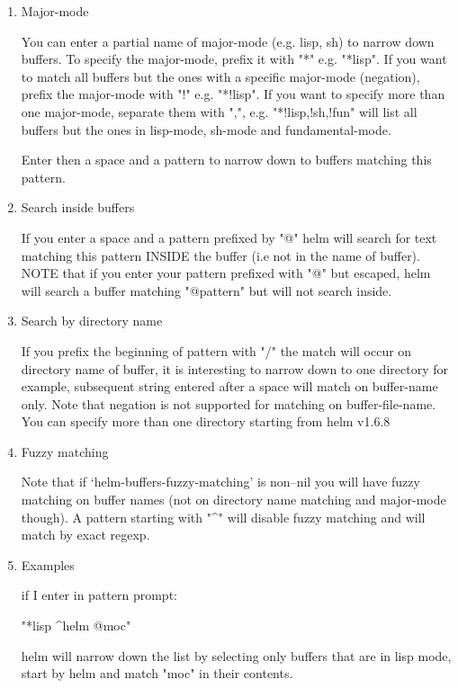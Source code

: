 \documentclass[11pt]{article}
\begin{document}
\begin{enumerate}
\item Major-mode
\label{sec:org63c0550}

You can enter a partial name of major-mode (e.g. lisp, sh) to narrow down buffers.
To specify the major-mode, prefix it with "*" e.g. "*lisp".
If you want to match all buffers but the ones with a specific major-mode (negation),
prefix the major-mode with "!" e.g. "*!lisp".
If you want to specify more than one major-mode, separate them with ",",
e.g. "*!lisp,!sh,!fun" will list all buffers but the ones in lisp-mode, sh-mode and
fundamental-mode.

Enter then a space and a pattern to narrow down to buffers matching this pattern.

\item Search inside buffers
\label{sec:orge420310}

If you enter a space and a pattern prefixed by "@" helm will search for text matching
this pattern INSIDE the buffer (i.e not in the name of buffer).
NOTE that if you enter your pattern prefixed with "@" but escaped, helm will search a buffer
matching "@pattern" but will not search inside.

\item Search by directory name
\label{sec:orgc2e4453}

If you prefix the beginning of pattern with "/" the match will occur on directory name
of buffer, it is interesting to narrow down to one directory for example, subsequent string
entered after a space will match on buffer-name only.
Note that negation is not supported for matching on buffer-file-name.
You can specify more than one directory starting from helm v1.6.8

\item Fuzzy matching
\label{sec:org8646540}

Note that if ‘helm-buffers-fuzzy-matching’ is non--nil you will have
fuzzy matching on buffer names (not on directory name matching and major-mode though).
A pattern starting with "\^{}" will disable fuzzy matching and will match by exact regexp.

\item Examples
\label{sec:org2807853}

if I enter in pattern prompt:

"*lisp \^{}helm @moc"

helm will narrow down the list by selecting only buffers that are in lisp mode, start by helm
and match "moc" in their contents.


\end{enumerate}
\end{document}
